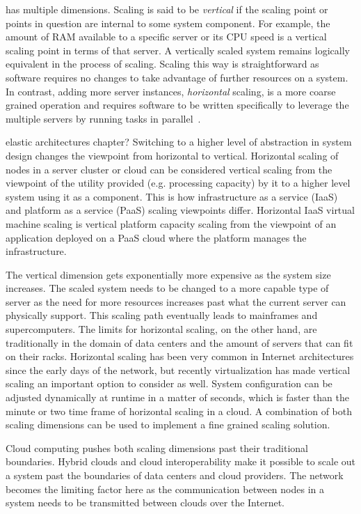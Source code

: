 \documentclass[english]{tktltiki2}
\theoremstyle{definition}
\theoremstyle{remark}
\begin{document}
has multiple dimensions. Scaling is said to be \emph{vertical} if the scaling
point or points in question are internal to some system component. For example,
the amount of RAM available to a specific server or its CPU speed is a vertical
scaling point in terms of that server. A vertically scaled system remains
logically equivalent in the process of scaling. Scaling this way is
straightforward as software requires no changes to take advantage of further
resources on a system. In contrast, adding more server instances,
\emph{horizontal} scaling, is a more coarse grained operation and requires
software to be written specifically to leverage the multiple servers by running
tasks in parallel~\cite{handbook-scaling}.

elastic architectures chapter? Switching to a higher level of abstraction in
system design changes the viewpoint from horizontal to vertical. Horizontal
scaling of nodes in a server cluster or cloud can be considered vertical scaling
from the viewpoint of the utility provided (e.g. processing capacity) by it to a
higher level system using it as a component. This is how infrastructure as a
service (IaaS) and platform as a service (PaaS) scaling viewpoints differ.
Horizontal IaaS virtual machine scaling is vertical platform capacity scaling
from the viewpoint of an application deployed on a PaaS cloud where the platform
manages the infrastructure.

The vertical dimension gets exponentially more expensive as the system size
increases. The scaled system needs to be changed to a more capable type of
server as the need for more resources increases past what the current server can
physically support. This scaling path eventually leads to mainframes and
supercomputers. The limits for horizontal scaling, on the other hand, are
traditionally in the domain of data centers and the amount of servers that can
fit on their racks. Horizontal scaling has been very common in Internet
architectures since the early days of the network, but recently virtualization
has made vertical scaling an important option to consider as well. System
configuration can be adjusted dynamically at runtime in a matter of seconds,
which is faster than the minute or two time frame of horizontal scaling in a
cloud. A combination of both scaling dimensions can be used to implement a fine
grained scaling solution.

Cloud computing pushes both scaling dimensions past their traditional
boundaries. Hybrid clouds and cloud interoperability make it possible to scale
out a system past the boundaries of data centers and cloud providers. The
network becomes the limiting factor here as the communication between nodes in a
system needs to be transmitted between clouds over the Internet.
\end{document}
